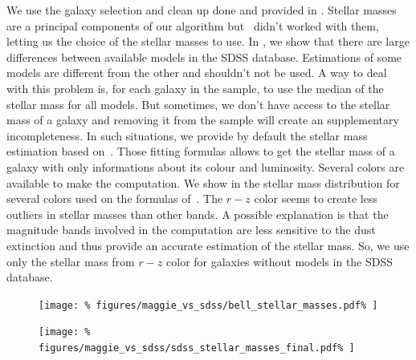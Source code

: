 We use the galaxy selection and clean up done and provided in
\cite{Tempel+14}. Stellar masses are a principal components of our algorithm
but~\cite{Tempel+14} didn't worked with them, letting us the choice of the
stellar masses to use. In , we show that
there are large differences between available models in the SDSS database.
Estimations of some models are different from the other and shouldn't not be
used. A way to deal with this problem is, for each galaxy in the sample, to
use the median of the stellar mass for all models. But sometimes, we don't
have access to the stellar mass of a galaxy and removing it from the sample
will create an supplementary incompleteness. In such situations, we provide
by default the stellar mass estimation based on~\cite{Bell+03}. Those
fitting formulas allows to get the stellar mass of a galaxy with only
informations about its colour and luminosity. Several colors are available
to make the computation. We show in  the
stellar mass distribution for several colors used on the formulas
of~\cite{Bell+03}. The $r-z$ color seems to create less outliers in stellar
masses than other bands. A possible explanation is that the magnitude bands
involved in the computation are less sensitive to the dust extinction and
thus provide an accurate estimation of the stellar mass. So, we use only the
stellar mass from $r-z$ color for galaxies without models in the SDSS
database.

\begin{figure}[htb]
    \centering
    \begin{minipage}{0.49\linewidth}
        \centering
        \texttt{[image: \%
            figures/maggie\_vs\_sdss/bell\_stellar\_masses.pdf\%
        ]}
    \end{minipage}
    \begin{minipage}{0.49\linewidth}
        \centering
        \texttt{[image: \%
            figures/maggie\_vs\_sdss/sdss\_stellar\_masses\_final.pdf\%
        ]}
    \end{minipage}
\end{figure}

